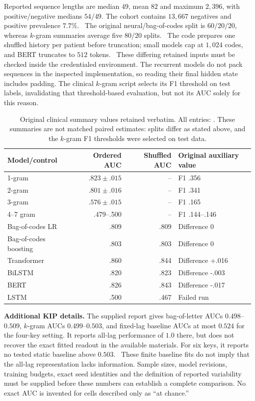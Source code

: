 Reported sequence lengths are median $49$, mean $82$ and maximum $2{,}396$, with positive/negative medians $54/49$. The cohort contains $13{,}667$ negatives and positive prevalence $7.7\%$. \ou\ The original neural/bag-of-codes split is $60/20/20$, whereas $k$-gram summaries average five $80/20$ splits. \ou\ The code prepares one shuffled history per patient before truncation; small models cap at $1{,}024$ codes, and BERT truncates to $512$ tokens. \orig\ These differing retained inputs must be checked inside the credentialed environment. The recurrent models do not pack sequences in the inspected implementation, so reading their final hidden state includes padding. The clinical $k$-gram script selects its F1 threshold on test labels, invalidating that threshold-based evaluation, but not its AUC solely for this reason.

\begin{table}[H]
\centering\small
\caption{Original clinical summary values retained verbatim. All entries: \ou. These summaries are not matched paired estimates: splits differ as stated above, and the $k$-gram F1 thresholds were selected on test data.}
\begin{tabular}{@{}lrrl@{}}\toprule
Model/control & Ordered AUC & Shuffled AUC & Original auxiliary value \\\midrule
1-gram & $.823\pm.015$ & -- & F1 .356 \\
2-gram & $.801\pm.016$ & -- & F1 .341 \\
3-gram & $.576\pm.015$ & -- & F1 .165 \\
4--7 gram & .479--.500 & -- & F1 .144--.146 \\
Bag-of-codes LR & .809 & .809 & Difference 0 \\
Bag-of-codes boosting & .803 & .803 & Difference 0 \\
Transformer & .860 & .844 & Difference +.016 \\
BiLSTM & .820 & .823 & Difference -.003 \\
BERT & .826 & .843 & Difference -.017 \\
LSTM & .500 & .467 & Failed run \\
\bottomrule\end{tabular}
\end{table}

\textbf{Additional KIP details.} The supplied report gives bag-of-letter AUCs $0.498$--$0.509$, $k$-gram AUCs $0.499$--$0.503$, and fixed-lag baseline AUCs at most $0.524$ for the four-key setting. It reports all-lag performance of $1.0$ there, but does not recover the exact fitted readout in the available materials. For six keys, it reports no tested static baseline above $0.503$. \ou\ These finite baseline fits do not imply that the all-lag representation lacks information. Sample sizes, model revisions, training budgets, exact seed identities and the definition of reported variability must be supplied before these numbers can establish a complete comparison. No exact AUC is invented for cells described only as ``at chance.''

